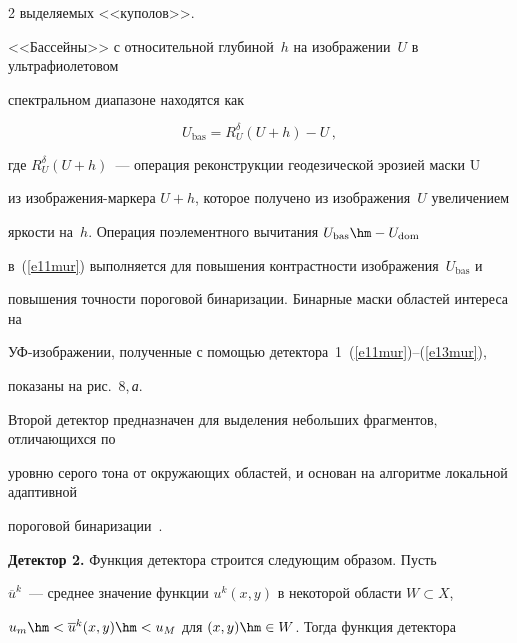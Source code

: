 \begin{multicols}{2}
выделяемых <<куполов>>.


  


  <<Бассейны>> с относительной глубиной~$h$ на изоб\-ра\-же\-нии~$U$ в ультрафиолетовом 


спектральном диапазоне находятся как


  \begin{equation}


  U_{\mathrm{bas}} =R_U^\delta \left(U+h\right) -U\,,


  \label{e13mur}


  \end{equation}


где $ R_U^\delta \left(U+h\right)$~--- операция реконструкции геодезической эрозией маски U 


из изображения-маркера $U+h$, которое получено из изображения~$U$ увеличением 


яркости на~$h$. Операция поэлементного вычитания $U_{\mathrm{bas}}\hm-U_{\mathrm{dom}}$ 


в~(\ref{e11mur}) выполняется для повышения контрастности изображения~$U_{\mathrm{bas}}$ и 


повышения точности пороговой бинаризации. Бинарные маски областей интереса на 


УФ-изоб\-ра\-же\-нии, полученные с помощью детектора~1~(\ref{e11mur})--(\ref{e13mur}), 


показаны на рис.~8,\,\textit{а}.





  Второй детектор предназначен для выделения небольших фрагментов, отличающихся по 


уровню серого тона от окружающих областей, и основан на алгоритме локальной адаптивной 


пороговой бинаризации~\cite{17mur}.





\smallskip





\noindent


\textbf{Детектор 2.} Функция детектора строится сле\-ду\-ющим образом. Пусть 


$\overline{u}^k$~--- среднее значение функции $u^k(x,y)$ в некоторой области $W\subset X$, 


$u_m\hm< \overline{u}^k(x,y)\hm < u_M$ для $(x,y)\hm\in W$. Тогда функция детектора 



\end{multicols}
